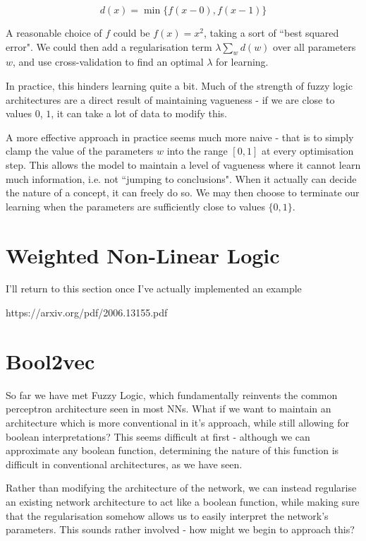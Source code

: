 \documentclass[conference]{report}
\begin{document}
$$d(x) = \min\{f(x - 0), f(x - 1)\}$$

A reasonable choice of $f$ could be $f(x)=x^2$, taking a sort of ``best squared error". We could then add a regularisation term $\lambda \sum_w d(w)$ over all parameters $w$, and use cross-validation to find an optimal $\lambda$ for learning.

In practice, this hinders learning quite a bit. Much of the strength of fuzzy logic architectures are a direct result of maintaining vagueness - if we are close to values $0$, $1$, it can take a lot of data to modify this.

A more effective approach in practice seems much more naive - that is to simply clamp the value of the parameters $w$ into the range $[0,1]$ at every optimisation step. This allows the model to maintain a level of vagueness where it cannot learn much information, i.e. not ``jumping to conclusions". When it actually can decide the nature of a concept, it can freely do so. We may then choose to terminate our learning when the parameters are sufficiently close to values $\{0,1\}$.

\section{Weighted Non-Linear Logic}

I'll return to this section once I've actually implemented an example

https://arxiv.org/pdf/2006.13155.pdf

\section{Bool2vec}

So far we have met Fuzzy Logic, which fundamentally reinvents the common perceptron architecture seen in most NNs. What if we want to maintain an architecture which is more conventional in it's approach, while still allowing for boolean interpretations? This seems difficult at first - although we can approximate any boolean function, determining the nature of this function is difficult in conventional architectures, as we have seen.

Rather than modifying the architecture of the network, we can instead regularise an existing network architecture to act like a boolean function, while making sure that the regularisation somehow allows us to easily interpret the network's parameters. This sounds rather involved - how might we begin to approach this?
\end{document}
